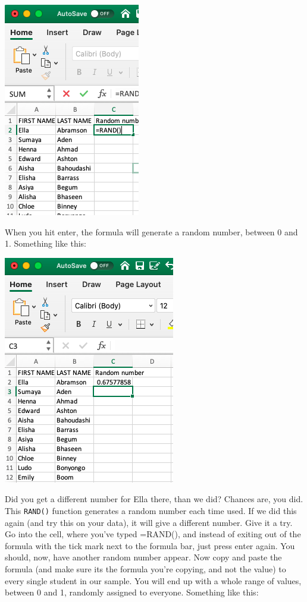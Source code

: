 \documentclass[
]{book}
\begin{document}
\includegraphics{imgs/type_rand.png}

When you hit enter, the formula will generate a random number, between 0 and 1. Something like this:

\includegraphics{imgs/first_rand.png}

Did you get a different number for Ella there, than we did? Chances are, you did. This \texttt{RAND()} function generates a random number each time used. If we did this again (and try this on your data), it will give a different number. Give it a try. Go into the cell, where you've typed =RAND(), and instead of exiting out of the formula with the tick mark next to the formula bar, just press enter again. You should, now, have another random number appear. Now copy and paste the formula (and make sure its the formula you're copying, and not the value) to every single student in our sample. You will end up with a whole range of values, between 0 and 1, randomly assigned to everyone. Something like this:
\end{document}
